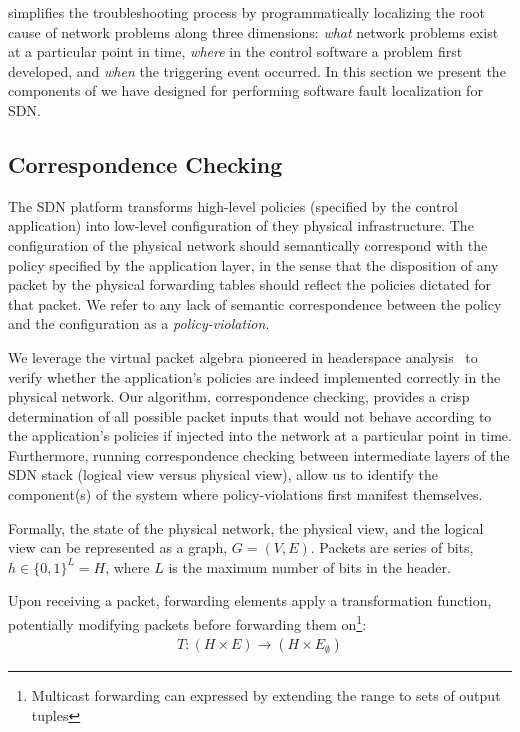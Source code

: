 \projectname{} simplifies the troubleshooting process by programmatically localizing the root cause
of network problems along three dimensions: {\it what} network problems exist at a
particular point in time, {\it where} in the control software a problem first developed, and
{\it when} the triggering event occurred. In this section we present
the components of \projectname{} we have designed for performing software fault localization for SDN.

\subsection{Correspondence Checking}

The SDN platform transforms high-level policies (specified by the control application) into low-level configuration of they physical infrastructure.
The configuration of the physical network should semantically correspond with the policy specified by the application layer, in the sense that the disposition of any packet by the physical forwarding tables should reflect  the policies dictated for that packet. We refer to any lack of semantic correspondence
between the policy and the configuration as a {\it policy-violation}.

We leverage the virtual packet algebra pioneered in headerspace
analysis~\cite{hsa} to verify whether the application's policies are indeed
implemented correctly in the physical network. Our algorithm, correspondence
checking, provides a crisp determination of all possible packet inputs that
would not behave according to the application's policies if injected into the
network at a particular point in time. Furthermore, running correspondence
checking between intermediate layers of the SDN stack (logical view versus
physical view), allow us to identify the component(s) of
the system where policy-violations first manifest themselves.

Formally, the state of the physical network, the physical view, and the
logical view can be represented as a graph,
$G = (V, E)$. Packets are series of bits, $h \in \{0,1\}^L = H$,
where $L$ is the maximum number of bits in the header.

Upon receiving a packet,
forwarding elements apply a transformation function, potentially modifying
packets before forwarding them on\footnote{Multicast forwarding can expressed
by extending the range to sets of output tuples}:
\begin{align*}
T: (H \times E) \rightarrow (H \times E_{\emptyset})
\end{align*}

